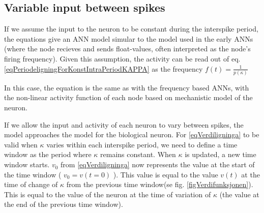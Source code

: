 \subsection{Variable input between spikes}
\label{ssecVariableInputBetweenSpikes}
If we assume the input to the neuron to be constant during the interspike period, the equations give an ANN model simular to the model used in the early ANNs 
	(where the node recieves and sends float-values, often interpreted as the node's firing frequency). %
Given this assumption, the activity can be read out of eq. \eqref{eqPeriodeligningForKonstIntraPeriodKAPPA} as the frequency $f(t) = \frac{1}{p(\kappa)}$

In this case, the equation is the same as with the frequency based ANNs, with the non-linear activity function of each node based on mechanistic model of the neuron. %


If we allow the input and activity of each neuron to vary between spikes, the model approaches the model for the biological neuron.
For \eqref{eqVerdiligninga} to be valid when $\kappa$ varies within each interspike period, we need to define a time window as the period where $\kappa$ remains constant. 
When $\kappa$ is updated, a new time window starts. 
$v_0$ from \eqref{eqVerdiligninga} now represents the value at the start of the time window ( $v_0 = v(t=0)$ ). 
This value is equal to the value $v(t)$ at the time of change of $\kappa$ from the previous time window(se fig. \ref{figVerdifunksjonen}).
This is equal to the value of the neuron at the time of variation of $\kappa$ (the value at the end of the previous time window).

